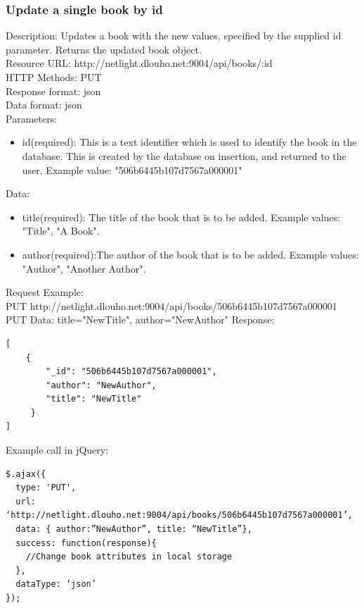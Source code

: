\subsubsection{Update a single book by id}
Description: Updates a book with the new values, specified by the supplied id parameter. Returns the updated book object.	\\
\newline
Resource URL: http://netlight.dlouho.net:9004/api/books/:id	\\
HTTP Methods: PUT		\\
Response format: json	\\
Data format: json		\\
Parameters: 			\\
\begin{itemize}

\item id(required): This is a text identifier which is used to identify the book in the database. This is created by the database on insertion, and returned to the user. Example value: "506b6445b107d7567a000001"

\end{itemize}
Data:
\begin{itemize}

\item title(required): The title of the book that is to be added. Example values: "Title", "A Book".

\item author(required):The author of the book that is to be added. Example values: "Author", "Another Author".

\end{itemize}
Request Example:		\\
PUT 		http://netlight.dlouho.net:9004/api/books/506b6445b107d7567a000001	\\
PUT Data: title="NewTitle", author="NewAuthor"
\newline
Response:
\begin{verbatim}
[
    {
        "_id": "506b6445b107d7567a000001",
        "author": "NewAuthor",
        "title": "NewTitle"
     }
]
\end{verbatim}
Example call in jQuery:
\begin{verbatim}
$.ajax({
  type: 'PUT',
  url: ‘http://netlight.dlouho.net:9004/api/books/506b6445b107d7567a000001’,
  data: { author:”NewAuthor”, title: “NewTitle”},
  success: function(response){
  	//Change book attributes in local storage
  },
  dataType: ‘json’
});
\end{verbatim}

